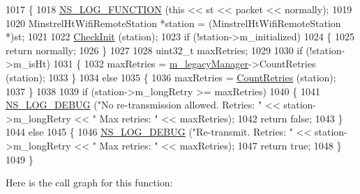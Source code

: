 \begin{DoxyCode}
1017 \{
1018   \hyperlink{log-macros-disabled_8h_a90b90d5bad1f39cb1b64923ea94c0761}{NS\_LOG\_FUNCTION} (\textcolor{keyword}{this} << st << packet << normally);
1019 
1020   MinstrelHtWifiRemoteStation *station = (MinstrelHtWifiRemoteStation *)st;
1021 
1022   \hyperlink{classns3_1_1MinstrelHtWifiManager_a7f94804a34efa6121bdfd5d01ac34694}{CheckInit} (station);
1023   \textcolor{keywordflow}{if} (!station->m\_initialized)
1024     \{
1025       \textcolor{keywordflow}{return} normally;
1026     \}
1027 
1028   uint32\_t maxRetries;
1029 
1030   \textcolor{keywordflow}{if} (!station->m\_isHt)
1031     \{
1032       maxRetries = \hyperlink{classns3_1_1MinstrelHtWifiManager_ae10ffd948e46a60593b1aef80372082a}{m\_legacyManager}->CountRetries (station);
1033     \}
1034   \textcolor{keywordflow}{else}
1035     \{
1036       maxRetries = \hyperlink{classns3_1_1MinstrelHtWifiManager_a049c7b034d4647393f6949467fbcb628}{CountRetries} (station);
1037     \}
1038 
1039   \textcolor{keywordflow}{if} (station->m\_longRetry >= maxRetries)
1040     \{
1041       \hyperlink{group__logging_ga413f1886406d49f59a6a0a89b77b4d0a}{NS\_LOG\_DEBUG} (\textcolor{stringliteral}{"No re-transmission allowed. Retries: "} <<  station->m\_longRetry << \textcolor{stringliteral}{" Max
       retries: "} << maxRetries);
1042       \textcolor{keywordflow}{return} \textcolor{keyword}{false};
1043     \}
1044   \textcolor{keywordflow}{else}
1045     \{
1046       \hyperlink{group__logging_ga413f1886406d49f59a6a0a89b77b4d0a}{NS\_LOG\_DEBUG} (\textcolor{stringliteral}{"Re-transmit. Retries: "} <<  station->m\_longRetry << \textcolor{stringliteral}{" Max retries: "} << 
      maxRetries);
1047       \textcolor{keywordflow}{return} \textcolor{keyword}{true};
1048     \}
1049 \}
\end{DoxyCode}


Here is the call graph for this function\+:



